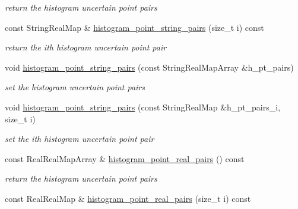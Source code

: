 \begin{DoxyCompactItemize}
\begin{DoxyCompactList}\small\item\em return the histogram uncertain point pairs \end{DoxyCompactList}\item 
const String\+Real\+Map \& \hyperlink{classPecos_1_1AleatoryDistParams_a128f9ae5d9d25a2d5d1eb8946a20d4f7}{histogram\+\_\+point\+\_\+string\+\_\+pairs} (size\+\_\+t i) const \label{classPecos_1_1AleatoryDistParams_a128f9ae5d9d25a2d5d1eb8946a20d4f7}

\begin{DoxyCompactList}\small\item\em return the ith histogram uncertain point pair \end{DoxyCompactList}\item 
void \hyperlink{classPecos_1_1AleatoryDistParams_a66c85955ae8affa769bd4ba4fed0fa8e}{histogram\+\_\+point\+\_\+string\+\_\+pairs} (const String\+Real\+Map\+Array \&h\+\_\+pt\+\_\+pairs)\label{classPecos_1_1AleatoryDistParams_a66c85955ae8affa769bd4ba4fed0fa8e}

\begin{DoxyCompactList}\small\item\em set the histogram uncertain point pairs \end{DoxyCompactList}\item 
void \hyperlink{classPecos_1_1AleatoryDistParams_a2aa8638ec29ba17bfb3556720ccb9255}{histogram\+\_\+point\+\_\+string\+\_\+pairs} (const String\+Real\+Map \&h\+\_\+pt\+\_\+pairs\+\_\+i, size\+\_\+t i)\label{classPecos_1_1AleatoryDistParams_a2aa8638ec29ba17bfb3556720ccb9255}

\begin{DoxyCompactList}\small\item\em set the ith histogram uncertain point pair \end{DoxyCompactList}\item 
const Real\+Real\+Map\+Array \& \hyperlink{classPecos_1_1AleatoryDistParams_a70a12b8141b33f7ea9d3b2acac7f4c69}{histogram\+\_\+point\+\_\+real\+\_\+pairs} () const \label{classPecos_1_1AleatoryDistParams_a70a12b8141b33f7ea9d3b2acac7f4c69}

\begin{DoxyCompactList}\small\item\em return the histogram uncertain point pairs \end{DoxyCompactList}\item 
const Real\+Real\+Map \& \hyperlink{classPecos_1_1AleatoryDistParams_ad67b750c867cb7367dca88b5ca4bb020}{histogram\+\_\+point\+\_\+real\+\_\+pairs} (size\+\_\+t i) const \label{classPecos_1_1AleatoryDistParams_ad67b750c867cb7367dca88b5ca4bb020}


\end{DoxyCompactItemize}
